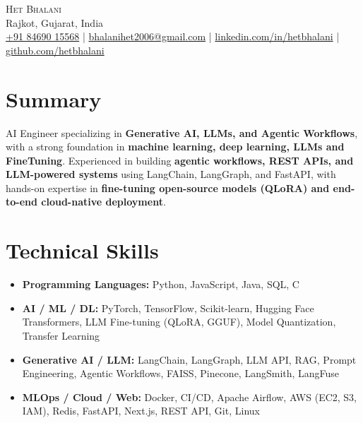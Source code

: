 \documentclass[a4paper,10pt]{article}
\begin{document}
\begin{center}
    {\Huge \scshape Het Bhalani} \\[3pt]
    Rajkot, Gujarat, India \\[2pt]
    \small
    \href{tel:+918469015568}{+91 84690 15568} |
    \href{mailto:bhalanihet2006@gmail.com}{bhalanihet2006@gmail.com} |
    \href{https://linkedin.com/in/hetbhalani/}{linkedin.com/in/hetbhalani} |
    \href{https://github.com/hetbhalani}{github.com/hetbhalani} 
\end{center}

\vspace{-4pt}

\section*{Summary}
AI Engineer specializing in \textbf{Generative AI, LLMs, and Agentic Workflows}, with a strong foundation in \textbf{machine learning, deep learning, LLMs and FineTuning}. Experienced in building \textbf{agentic workflows, REST APIs, and LLM-powered systems} using LangChain, LangGraph, and FastAPI, with hands-on expertise in \textbf{fine-tuning open-source models (QLoRA) and end-to-end cloud-native deployment}.

\section*{Technical Skills}
\begin{itemize}
    \item \textbf{Programming Languages:} Python, JavaScript, Java, SQL, C
    \item \textbf{AI / ML / DL:} PyTorch, TensorFlow, Scikit-learn, Hugging Face Transformers, LLM Fine-tuning (QLoRA, GGUF), Model Quantization, Transfer Learning
    \item \textbf{Generative AI / LLM:} LangChain, LangGraph, LLM API, RAG, Prompt Engineering, Agentic Workflows, FAISS, Pinecone, LangSmith, LangFuse
    \item \textbf{MLOps / Cloud / Web:} Docker, CI/CD, Apache Airflow, AWS (EC2, S3, IAM), Redis, FastAPI, Next.js, REST API, Git, Linux
\end{itemize}
\end{document}
